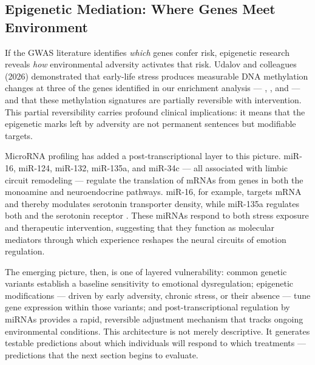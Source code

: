

\subsection*{Epigenetic Mediation: Where Genes Meet Environment}

If the GWAS literature identifies \emph{which} genes confer risk, epigenetic
research reveals \emph{how} environmental adversity activates that risk.
Udalov and colleagues (2026) demonstrated that early-life stress produces
measurable DNA methylation changes at three of the genes identified in our
enrichment analysis — , , and  — and that
these methylation signatures are partially reversible with
intervention.\cite{udalov2026}
This partial reversibility carries profound clinical implications: it means that
the epigenetic marks left by adversity are not permanent sentences but
modifiable targets.

MicroRNA profiling has added a post-transcriptional layer to this picture.
miR-16, miR-124, miR-132, miR-135a, and miR-34c — all associated with limbic
circuit remodeling — regulate the translation of mRNAs from genes in both the
monoamine and neuroendocrine pathways.\cite{udalov2026}
miR-16, for example, targets  mRNA and thereby modulates
serotonin transporter density, while miR-135a regulates both  and
the serotonin receptor .\cite{udalov2026}
These miRNAs respond to both stress exposure and therapeutic intervention,
suggesting that they function as molecular mediators through which experience
reshapes the neural circuits of emotion regulation.

The emerging picture, then, is one of layered vulnerability: common genetic
variants establish a baseline sensitivity to emotional dysregulation; epigenetic
modifications — driven by early adversity, chronic stress, or their absence —
tune gene expression within those variants; and post-transcriptional regulation
by miRNAs provides a rapid, reversible adjustment mechanism that tracks ongoing
environmental conditions.
This architecture is not merely descriptive.
It generates testable predictions about which individuals will respond to which
treatments — predictions that the next section begins to evaluate.



